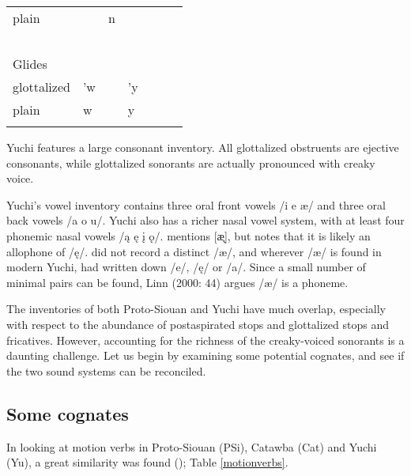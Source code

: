 \documentclass[output=paper]{LSP/langsci}
\begin{document}
{\begin{table}[h!]
\begin{tabular}{llllll}
plain                       & ~                   & n                    & ~                       & ~                   & ~                \\
~                           & ~                   & ~                    & ~                       & ~                   & ~                \\
 Glides           & ~                   & ~                    & ~                       & ~                   & ~                \\
glottalized                 & 'w                  & ~                    & 'y                      & ~                   & ~                \\
plain                       & w                   & ~                    & y                       & ~                   & ~                \\ \lspbottomrule
\end{tabular}
\end{table}

Yuchi features a large consonant inventory. All glottalized obstruents are ejective consonants, while glottalized sonorants are actually pronounced with creaky voice. 

Yuchi's vowel inventory contains three oral front vowels /i e \ae/ and three oral back vowels /a o u/. Yuchi also has a richer nasal vowel system, with at least four phonemic nasal vowels /\k{a} \k{e} \k{i} \k{o}/. \citet{Linn2000} mentions [\k{\ae}], but notes that it is likely an allophone of /\k{e}/. \citet{Wagner1934} did not record a distinct /\ae/, and wherever /\ae/ is found in modern Yuchi, \citet{Wagner1934} had written down /e/, /\k{e}/ or /a/. Since a small number of minimal pairs can be found, Linn (2000: 44) argues /\ae/ is a phoneme.

The inventories of both Proto-Siouan and Yuchi have much overlap, especially with respect to the abundance of postaspirated stops and glottalized stops and fricatives. However, accounting for the richness of the creaky-voiced sonorants is a daunting challenge. Let us begin by examining some potential cognates, and see if the two sound systems can be reconciled.

\subsection{Some cognates}
 
In looking at motion verbs in Proto-Siouan (PSi), Catawba (Cat) and Yuchi (Yu), a great similarity was found (\citealt{Kasak2013}); Table \ref{motionverbs}.

}
\end{document}
